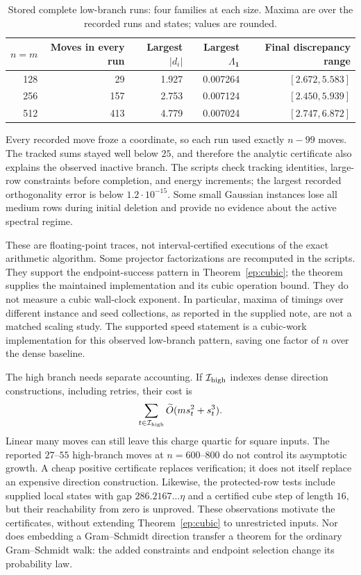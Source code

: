 \documentclass[11pt]{amsart}
\theoremstyle{definition}\newtheorem{definition}[theorem]{Definition}
\theoremstyle{remark}\newtheorem{remark}[theorem]{Remark}
\numberwithin{equation}{section}
\newcommand{\one}{\mathbf1}
\begin{document}
\begin{table}[ht]
\centering\small
\caption{Stored complete low-branch runs: four families at each size.
Maxima are over the recorded runs and states; values are rounded.}
\label{ep:table}
\begin{tabular}{@{}rrrrr@{}}
\toprule
$n=m$ & Moves in every run & Largest $|d_i|$ & Largest $\Lambda_{\one}$
 & Final discrepancy range\\
\midrule
128 & 29  & 1.927 & 0.007264 & $[2.672,5.583]$\\
256 & 157 & 2.753 & 0.007124 & $[2.450,5.939]$\\
512 & 413 & 4.779 & 0.007024 & $[2.747,6.872]$\\
\bottomrule
\end{tabular}
\end{table}

Every recorded move froze a coordinate, so each run used exactly
$n-99$ moves. The tracked sums stayed well below $25$, and therefore
the analytic certificate also explains the observed inactive branch.
The scripts check tracking identities, large-row constraints before
completion, and energy increments; the largest recorded orthogonality
error is below $1.2\cdot10^{-15}$. Some small Gaussian instances lose
all medium rows during initial deletion and provide no evidence about
the active spectral regime.

These are floating-point traces, not interval-certified executions of
the exact arithmetic algorithm. Some projector factorizations are
recomputed in the scripts. They support the endpoint-success pattern
in Theorem~\ref{ep:cubic}; the theorem supplies the maintained
implementation and its cubic operation bound. They do not measure a
cubic wall-clock exponent. In particular, maxima of timings over
different instance and seed collections, as reported in the supplied
note, are not a matched scaling study. The supported speed statement is
a cubic-work implementation for this observed low-branch pattern,
saving one factor of $n$ over the dense baseline.

The high branch needs separate accounting. If $\mathcal I_{\rm high}$
indexes dense direction constructions, including retries, their cost is
\begin{equation}\label{ep:high-cost}
 \sum_{t\in\mathcal I_{\rm high}}\widetilde O(ms_t^2+s_t^3).
\end{equation}
Linear many moves can still leave this charge quartic for square
inputs. The reported $27$--$55$ high-branch moves at $n=600$--$800$
do not control its asymptotic growth. A cheap positive certificate
replaces verification; it does not itself replace an expensive
direction construction. Likewise, the protected-row tests include
supplied local states with gap $286.2167\ldots\eta$ and a certified
cube step of length $16$, but their reachability from zero is unproved.
These observations motivate the certificates, without extending
Theorem~\ref{ep:cubic} to unrestricted inputs. Nor does embedding a
Gram--Schmidt direction transfer a theorem for the ordinary
Gram--Schmidt walk: the added constraints and endpoint selection
change its probability law.
\end{document}
